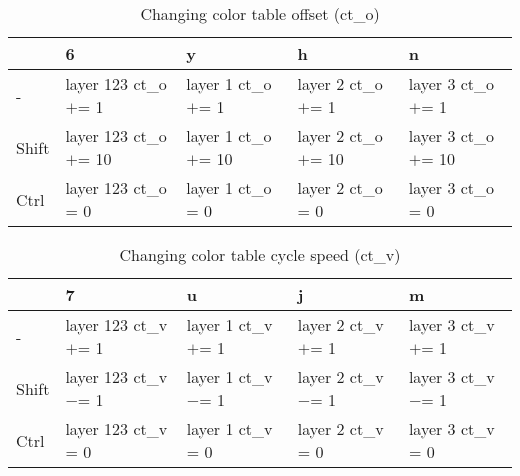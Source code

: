 \documentclass[10pt,a4paper]{article}
\begin{document}
\begin{table}[h!]
    \caption{Changing color table offset (ct\_o)}
    \setlength{\tabcolsep}{0.0pt}
    \begin{tabularx}{\linewidth}{LLLLL}
        \toprule
                   & 6                       & y                     & h                     & n                     \\
        \midrule                                                                          
        -          & layer 123 ct\_o $+$= 1  & layer 1 ct\_o $+$= 1  & layer 2 ct\_o $+$= 1  & layer 3 ct\_o $+$= 1  \\
        Shift      & layer 123 ct\_o $+$= 10 & layer 1 ct\_o $+$= 10 & layer 2 ct\_o $+$= 10 & layer 3 ct\_o $+$= 10 \\
        Ctrl       & layer 123 ct\_o = 0     & layer 1 ct\_o = 0     & layer 2 ct\_o = 0     & layer 3 ct\_o = 0     \\
        \bottomrule
    \end{tabularx}
\end{table}

\begin{table}[h!]
    \caption{Changing color table cycle speed (ct\_v)}
    \setlength{\tabcolsep}{0.0pt}
    \begin{tabularx}{\linewidth}{LLLLL}
        \toprule
                   & 7                      & u                    & j                    & m                    \\
        \midrule                                                                          
        -          & layer 123 ct\_v $+$= 1 & layer 1 ct\_v $+$= 1 & layer 2 ct\_v $+$= 1 & layer 3 ct\_v $+$= 1 \\
        Shift      & layer 123 ct\_v $-$= 1 & layer 1 ct\_v $-$= 1 & layer 2 ct\_v $-$= 1 & layer 3 ct\_v $-$= 1 \\
        Ctrl       & layer 123 ct\_v = 0    & layer 1 ct\_v = 0    & layer 2 ct\_v = 0    & layer 3 ct\_v = 0    \\
        \bottomrule
    \end{tabularx}
\end{table}
\end{document}
